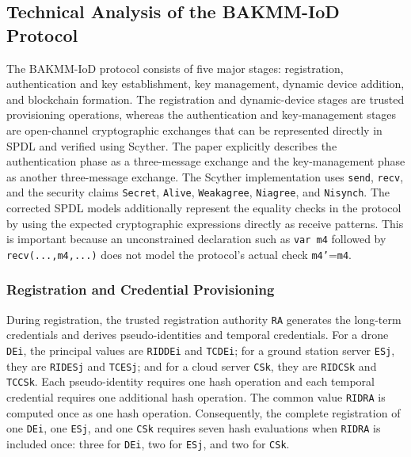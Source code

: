 
\subsection{Technical Analysis of the BAKMM-IoD Protocol}
\label{subsec:technical-analysis-bakmm}

The BAKMM-IoD protocol consists of five major stages: registration, authentication
and key establishment, key management, dynamic device addition, and blockchain
formation. The registration and dynamic-device stages are trusted provisioning
operations, whereas the authentication and key-management stages are open-channel
cryptographic exchanges that can be represented directly in SPDL and verified using
Scyther. The paper explicitly describes the authentication phase as a three-message
exchange and the key-management phase as another three-message exchange. The
Scyther implementation uses \texttt{send}, \texttt{recv}, and the security claims
\texttt{Secret}, \texttt{Alive}, \texttt{Weakagree}, \texttt{Niagree}, and
\texttt{Nisynch}. The corrected SPDL models additionally represent the equality
checks in the protocol by using the expected cryptographic expressions directly as
receive patterns. This is important because an unconstrained declaration such as
\texttt{var m4} followed by \texttt{recv(...,m4,...)} does not model the protocol's
actual check \texttt{m4'}=\texttt{m4}.

\subsubsection{Registration and Credential Provisioning}

During registration, the trusted registration authority \texttt{RA} generates the
long-term credentials and derives pseudo-identities and temporal credentials. For a
drone \texttt{DEi}, the principal values are \texttt{RIDDEi} and \texttt{TCDEi};
for a ground station server \texttt{ESj}, they are \texttt{RIDESj} and
\texttt{TCESj}; and for a cloud server \texttt{CSk}, they are \texttt{RIDCSk} and
\texttt{TCCSk}. Each pseudo-identity requires one hash operation and each temporal
credential requires one additional hash operation. The common value
\texttt{RIDRA} is computed once as one hash operation. Consequently, the complete
registration of one \texttt{DEi}, one \texttt{ESj}, and one \texttt{CSk} requires
seven hash evaluations when \texttt{RIDRA} is included once:
three for \texttt{DEi}, two for \texttt{ESj}, and two for \texttt{CSk}.

